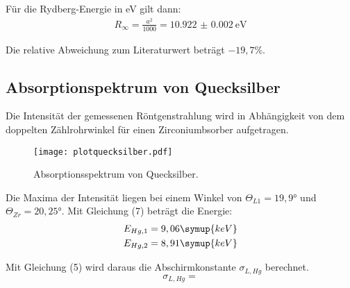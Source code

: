 Für die Rydberg-Energie in eV gilt dann:
\begin{align*}
  R_{\infty} = \frac{a^2}{1000} =\SI{10.922(2)}{\eV}
\end{align*}

Die relative Abweichung zum Literaturwert beträgt $-19,7 \%$.


\subsection{Absorptionspektrum von Quecksilber}

Die Intensität der gemessenen Röntgenstrahlung wird in Abhängigkeit von dem doppelten Zählrohrwinkel für
einen Zirconiumbsorber aufgetragen.

\begin{figure}[H]
  \centering
  \texttt{[image: plotquecksilber.pdf]}
  \caption{Absorptionsspektrum von Quecksilber.}
  \label{fig:plot}
\end{figure}


Die Maxima der Intensität liegen bei einem Winkel von $\Theta_{L1} = 19,9°$  und $\Theta_{Zr} = 20,25°$.
Mit Gleichung (7) beträgt die Energie:
\begin{align*}
  E_{Hg,1} = 9,06 \symup{keV} \\
  E_{Hg,2} = 8,91 \symup{keV}
\end{align*}

Mit Gleichung (5) wird daraus die Abschirmkonstante $\sigma_{L, Hg}$ berechnet.
\begin{equation*}
  \sigma_{L, Hg} =
\end{equation*}
